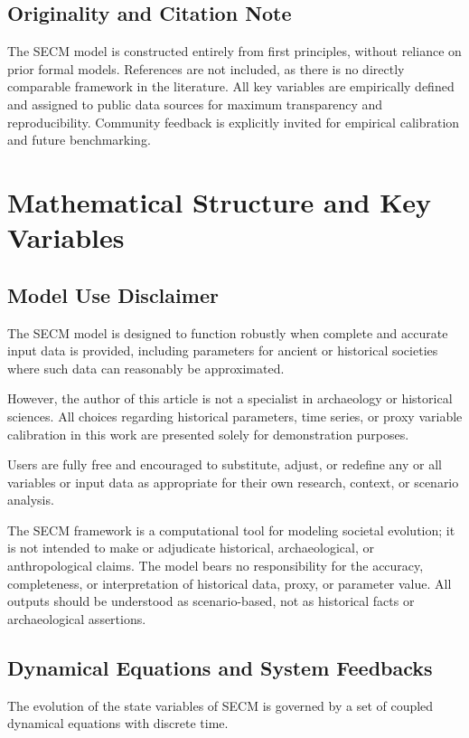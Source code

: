 \documentclass[12pt]{report}
\begin{document}
\subsection{Originality and Citation Note}
The SECM model is constructed entirely from first principles, without reliance on prior formal models. References are not included, as there is no directly comparable framework in the literature. All key variables are empirically defined and assigned to public data sources for maximum transparency and reproducibility. Community feedback is explicitly invited for empirical calibration and future benchmarking.

\section{Mathematical Structure and Key Variables}

\subsection{Model Use Disclaimer}
The SECM model is designed to function robustly when complete and accurate input data is provided, including parameters for ancient or historical societies where such data can reasonably be approximated.

However, the author of this article is not a specialist in archaeology or historical sciences. All choices regarding historical parameters, time series, or proxy variable calibration in this work are presented solely for demonstration purposes.

Users are fully free and encouraged to substitute, adjust, or redefine any or all variables or input data as appropriate for their own research, context, or scenario analysis.

The SECM framework is a computational tool for modeling societal evolution; it is not intended to make or adjudicate historical, archaeological, or anthropological claims. The model bears no responsibility for the accuracy, completeness, or interpretation of historical data, proxy, or parameter value. All outputs should be understood as scenario-based, not as historical facts or archaeological assertions.

\subsection{Dynamical Equations and System Feedbacks}
The evolution of the state variables of SECM is governed by a set of coupled dynamical equations with discrete time.
\end{document}
